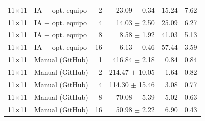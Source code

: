 \begin{tabular}{llrrrr}
11$\times$11 & IA + opt. equipo & 2 & 23.09 $\pm$ 0.34 & 15.24 & 7.62 \\
11$\times$11 & IA + opt. equipo & 4 & 14.03 $\pm$ 2.50 & 25.09 & 6.27 \\
11$\times$11 & IA + opt. equipo & 8 & 8.58 $\pm$ 1.92 & 41.03 & 5.13 \\
11$\times$11 & IA + opt. equipo & 16 & 6.13 $\pm$ 0.46 & 57.44 & 3.59 \\
11$\times$11 & Manual (GitHub) & 1 & 416.84 $\pm$ 2.18 & 0.84 & 0.84 \\
11$\times$11 & Manual (GitHub) & 2 & 214.47 $\pm$ 10.05 & 1.64 & 0.82 \\
11$\times$11 & Manual (GitHub) & 4 & 114.30 $\pm$ 15.46 & 3.08 & 0.77 \\
11$\times$11 & Manual (GitHub) & 8 & 70.08 $\pm$ 5.39 & 5.02 & 0.63 \\
11$\times$11 & Manual (GitHub) & 16 & 50.98 $\pm$ 2.22 & 6.90 & 0.43 \\
\bottomrule
\end{tabular}
